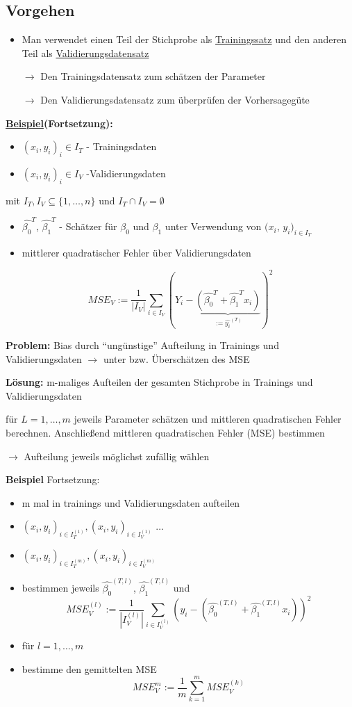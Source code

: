 \subsection{Vorgehen}
\begin{itemize}
	\item Man verwendet einen Teil der Stichprobe als \underline{Trainingssatz} und den anderen Teil als \underline{Validierungsdatensatz}
	\item[\( \rightarrow \)] Den Trainingsdatensatz zum schätzen der Parameter
	\item[\( \rightarrow \)] Den Validierungsdatensatz zum überprüfen der Vorhersagegüte
\end{itemize}

\textbf{\underline{Beispiel}(Fortsetzung):}
\begin{itemize}
	\item $(x_i, y_i)_i \in I_T$ - Trainingsdaten
	\item $(x_i,y_i)_i \in I_V$ -Validierungsdaten
\end{itemize}
mit $ I_T,  I_V \subseteq \{1,\ldots,n\}$   und $I_T \cap I_V = \emptyset$
	
\begin{itemize}
	\item $ \hat{\beta_0}^T $, $ \hat{\beta_1}^T $ - Schätzer für $\beta_0$ und  $\beta_1$ unter Verwendung von $ (x_i $, $ y_i $$ )_{i \in I_T} $
	\item mittlerer quadratischer Fehler über Validierungsdaten
\end{itemize}

\[MSE_V := \frac{1}{|I_V|} \sum_{i \in I_V}(Y_i - \underbrace{(  \hat{\beta_0}^T +  \hat{\beta_1}^T x_i)}_{:= \hat{y_i}^{(T)}})^2\]

\textbf{Problem:} Bias durch "`ungünstige"' Aufteilung in Trainings und Validierungsdaten $\rightarrow$
unter bzw. Überschätzen des MSE

\textbf{Lösung:} m-maliges Aufteilen der gesamten Stichprobe in Trainings und Validierungsdaten

für \(L=1,\ldots, m\) jeweils Parameter schätzen und mittleren quadratischen Fehler berechnen. Anschließend mittleren quadratischen Fehler (MSE) bestimmen

$\rightarrow$ Aufteilung jeweils möglichst zufällig wählen

\textbf{Beispiel} Fortsetzung:
\begin{itemize}
	\item m mal in trainings und Validierungsdaten aufteilen
	\item $ (x_i, y_i)_{i \in I_T^{(1)}} , (x_i,y_i)_{i \in I_V^{(1)}} $ $ \ldots $
	\item $ (x_i, y_i)_{i \in I_T^{(m)} }, (x_i,y_i)_{i \in I_V^{(m)}} $
	\item bestimmen jeweils  $\hat{\beta_0}^{(T,l)}$, $\hat{\beta_1}^{(T,l)}$ und 
	\[ MSE_V^{(l)} := \frac{1}{|I_V^{(l)}|} \sum_{i \in I_V^{(l)}}(y_i - (\hat{\beta_0}^{(T,l)} + \hat{\beta_1}^{(T,l)} x_i))^2  \]
	\item für $l = 1, \ldots, m$
	\item bestimme den gemittelten MSE
	\[MSE_V^m := \frac{1}{m} \sum_{k=1}^{m} MSE_V^{(k)}\]
\end{itemize}

